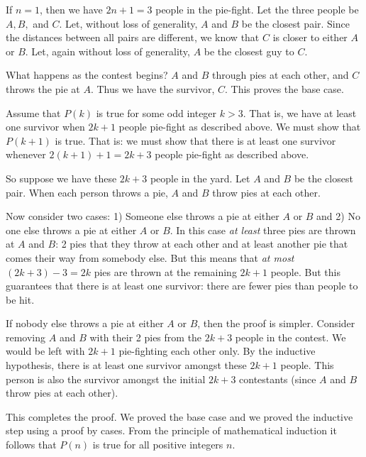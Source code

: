 \documentclass{tufte-handout}
\begin{document}
 If $n = 1$, then we have $2n + 1 = 3$ people in the pie-fight. Let the three people be $A, B,$ and $C$. Let, without loss of generality, $A$ and $B$ be the closest pair.  Since the distances between all pairs  are different, we know that $C$ is closer to either $A$ or $B$. Let, again without loss of generality, $A$ be the closest guy to $C$. 

  What happens as the contest begins? $A$ and $B$ through pies at each other, and $C$ throws the pie at $A$. Thus we have the survivor, $C$. This proves the base case.
  
      

 Assume that $P(k)$ is true for some odd integer $k > 3$. That is, we have at least one survivor when $2k + 1$ people pie-fight as described above. We must show that $P(k+1)$ is true. That is: we must show that there is at least one survivor whenever $2(k+1) + 1 = 2k + 3$ people pie-fight as described above.  

\bigskip
So suppose we have these $2k + 3$ people in the yard. Let $A$ and $B$ be the closest pair. When each person throws a pie, $A$ and $B$ throw pies at each other. 

\bigskip Now consider two cases: 1) Someone else throws a pie at either $A$ or $B$ and 2) No one else throws a pie  at either $A$ or $B$.
 In this case \textit{at least } three pies are thrown at $A$ and $B$: 2 pies that they throw at each other and at least another pie that comes their way from somebody else. But this means that \textit{at most } $(2k+3) - 3 = 2k$ pies are thrown at the remaining $2k + 1$ people. But this guarantees that there is at least one survivor: there are fewer pies than people to be hit. 

 If nobody else throws a pie at either $A$ or $B$, then the proof is simpler. Consider removing $A$ and $B$ with their 2 pies from the $2k + 3$ people in the contest. We would be left with $2k + 1$ pie-fighting each other only. By the inductive hypothesis, there is at least one survivor amongst these $2k+1$ people. This person is also the survivor amongst the initial $2k + 3$ contestants (since $A$ and $B$ throw pies at each other).

\bigskip
This completes the proof. We proved the base case and we proved the inductive step using a proof by cases. From the principle of mathematical induction it follows that $P(n)$ is true for all positive integers $n$. 
\end{document}
